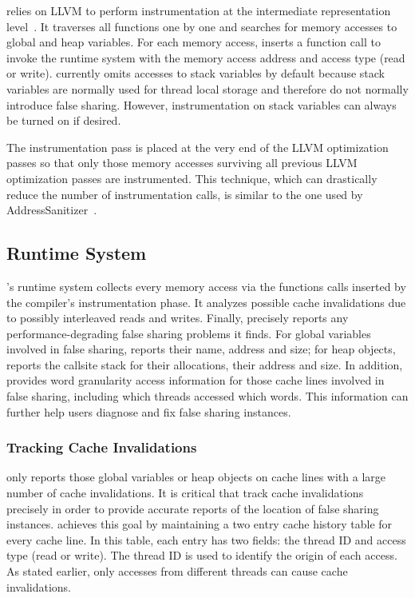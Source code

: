 \Predator{} relies on LLVM to perform instrumentation at the intermediate representation level~\cite{llvm}.
It traverses all functions one by one and searches for memory accesses to global and heap variables.  For each memory access, \Predator{} inserts a function call to invoke the runtime system with the memory access address and access type (read or write). \Predator{} currently omits accesses to stack variables by default because stack variables are normally used for thread local storage and therefore do not normally introduce false sharing. However, instrumentation on stack variables
can always be turned on if desired.

The instrumentation pass is placed at the very end of the LLVM
optimization passes so that only those memory accesses surviving all previous LLVM optimization passes are instrumented.  This technique, which can drastically reduce the number of instrumentation calls, is similar to the one used by AddressSanitizer~\cite{Addresssanitizer}.

\subsection{Runtime System}
\label{sec:runtime}

\Predator{}'s runtime system collects every memory access via the functions calls inserted by the compiler's instrumentation phase. It analyzes possible cache invalidations due to possibly interleaved reads and writes. Finally, \Predator{} precisely reports any performance-degrading false sharing problems it finds.  For global variables involved in false sharing, \Predator{} reports their name, address and size; for heap
objects, \Predator{} reports the callsite stack for their allocations, their address and size. In addition, \Predator{} provides word granularity access information for those cache lines involved in false sharing, including which threads accessed which words.  This information can further help users diagnose and fix false sharing instances.

\subsubsection{Tracking Cache Invalidations}
\Predator{} only reports those global variables or heap objects on cache lines with a large number of cache invalidations. It is critical that \Predator{} track cache invalidations precisely in order to provide accurate reports of the location of false sharing instances.
\Predator{} achieves this goal by maintaining a two entry cache history table for every cache line.  In this table,
each entry has two fields: the thread ID and access type (read or write). The thread ID is used to identify the origin of each access. As stated earlier, only accesses from different threads can cause cache invalidations.

